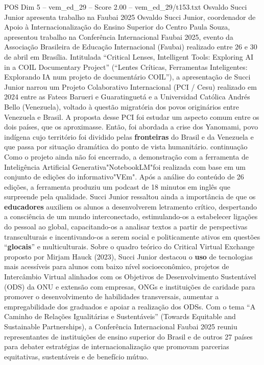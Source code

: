 \begin{textsample}{POS Dim 5 – vem\_ed\_29 – Score 2.00 – vem\_ed\_29/t153.txt}  \label{ex:f5_pos_045}
Osvaldo Succi Junior apresenta trabalho na Faubai 2025 Osvaldo Succi Junior, coordenador de Apoio à Internacionalização do Ensino Superior do Centro Paula Souza, apresentou trabalho na Conferência Internacional Faubai 2025, evento da Associação Brasileira de Educação Internacional (Faubai) realizado entre 26 e 30 de abril em Brasília.
Intitulada “Critical Lenses, Intelligent Tools: Exploring AI in a COIL Documentary Project” (“Lentes Críticas, Ferramentas Inteligentes: Explorando IA num projeto de documentário COIL”), a apresentação de Succi Junior narrou um Projeto Colaborativo Internacional (PCI / Cesu) realizado em 2024 entre as Fatecs Barueri e Guaratinguetá e a Universidad Católica Andrés Bello (Venezuela), voltado à questão migratória dos povos originários entre Venezuela e Brasil.
A proposta desse PCI foi estudar um aspecto comum entre os dois países, que os aproximasse.
Então, foi abordada a crise dos Yanomami, povo indígena cujo território foi dividido pelas \textbf{fronteiras} do Brasil e da Venezuela e que passa por situação dramática do ponto de vista humanitário. continuação Como o projeto ainda não foi encerrado, a demonstração com a ferramenta de Inteligência Artificial Generativa"NotebookLM"foi realizada com base em um conjunto de edições do informativo"VEm".
Após a análise do conteúdo de 26 edições, a ferramenta produziu um podcast de 18 minutos em inglês que surpreende pela qualidade.
Succi Junior ressaltou ainda a importância de que os \textbf{educadores} auxiliem os alunos a desenvolverem letramento crítico, despertando a consciência de um mundo interconectado, estimulando-os a estabelecer ligações do pessoal ao global, capacitando-os a analisar textos a partir de perspectivas transculturais e incentivando-os a serem social e politicamente ativos em questões “\textbf{glocais}” e multiculturais.
Sobre o quadro teórico do Critical Virtual Exchange proposto por Mirjam Hauck (2023), Succi Junior destacou o \textbf{uso} de tecnologias mais acessíveis para alunos com baixo nível socioeconômico, projetos de Intercâmbio Virtual alinhados com os Objetivos de Desenvolvimento Sustentável (ODS) da ONU e extensão com empresas, ONGs e instituições de caridade para promover o desenvolvimento de habilidades transversais, aumentar a empregabilidade dos graduados e apoiar a realização dos ODSs.
Com o tema “A Caminho de Relações Igualitárias e Sustentáveis” (Towards Equitable and Sustainable Partnerships), a Conferência Internacional Faubai 2025 reuniu representantes de instituições de ensino superior do Brasil e de outros 27 países para debater estratégias de internacionalização que promovam parcerias equitativas, sustentáveis e de benefício mútuo.

\end{textsample}
